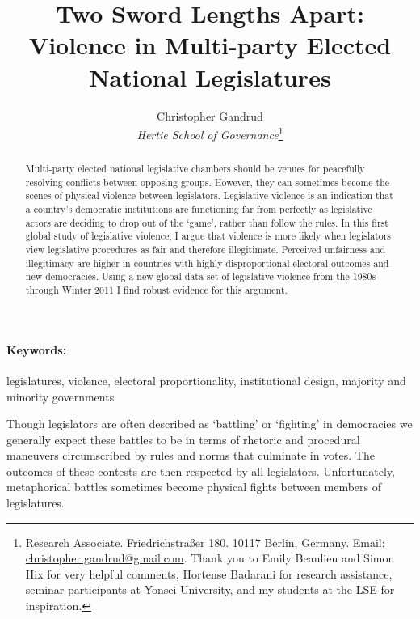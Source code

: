 \documentclass[a4paper]{article}\usepackage{graphicx, color}
\title{Two Sword Lengths Apart: Violence in Multi-party Elected National Legislatures}
\author{Christopher Gandrud \\
                {\emph{Hertie School of Governance}}\footnote{Research Associate. Friedrichstra{\ss}er 180. 10117 Berlin, Germany. Email: \href{mailto:christopher.gandrud@gmail.com}{christopher.gandrud@gmail.com}. Thank you to Emily Beaulieu and Simon Hix for very helpful comments, Hortense Badarani for research assistance, seminar participants at Yonsei University, and my students at the LSE for inspiration.}}
\date{}
\begin{document}
\maketitle

\begin{abstract}
Multi-party elected national legislative chambers should be venues for peacefully resolving conflicts between opposing groups. However, they can sometimes become the scenes of physical violence between legislators. Legislative violence is an indication that a country's democratic institutions are functioning far from perfectly as legislative actors are deciding to drop out of the `game', rather than follow the rules. In this first global study of legislative violence, I argue that violence is more likely when legislators view legislative procedures as fair and therefore illegitimate. Perceived unfairness and illegitimacy are higher in countries with highly disproportional electoral outcomes and new democracies. Using a new global data set of legislative violence from the 1980s through Winter 2011 I find robust evidence for this argument.
\end{abstract}


\paragraph{Keywords:} legislatures, violence, electoral proportionality, institutional design, majority and minority governments

\vspace{0.3cm}


Though legislators are often described as `battling' or `fighting' in democracies we generally expect these battles to be in terms of rhetoric and procedural maneuvers circumscribed by rules and norms that culminate in votes. The outcomes of these contests are then respected by all legislators. Unfortunately, metaphorical battles sometimes become physical fights between members of legislatures. 
\end{document}
